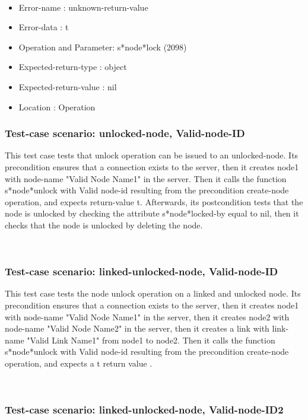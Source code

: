 \
\begin {itemize}
\item 	Error-name             : unknown-return-value
\item Error-data             : t
\item Operation and Parameter: s*node*lock (2098)
\item Expected-return-type   : object
\item Expected-return-value  : nil
\item Location               : Operation



\end {itemize}
\subsubsection {Test-case scenario: unlocked-node, Valid-node-ID}


This test case tests that unlock operation can be issued to an unlocked-node.
Its precondition ensures that a connection exists to the server, then it creates node1 with node-name "Valid Node Name1" in the server.
Then it calls the function s*node*unlock  with Valid node-id resulting from the precondition create-node operation, and expects return-value t.
Afterwards, its postcondition tests that the node is unlocked by checking the attribute
s*node*locked-by equal to nil, then it checks that the node is unlocked by deleting the node.




\
\subsubsection {Test-case scenario: linked-unlocked-node, Valid-node-ID}


This test case tests the node unlock operation on a linked and unlocked node.
Its precondition ensures that a connection exists to the server, then it creates node1 with node-name "Valid Node Name1" in the server, then it creates node2 with node-name  "Valid Node Name2" in the server, then it creates a link with link-name "Valid Link Name1" from node1 to node2.
Then it calls the function s*node*unlock  with Valid node-id resulting from the precondition create-node operation, and expects a t return value .





\
\subsubsection {Test-case scenario: linked-unlocked-node, Valid-node-ID2}


